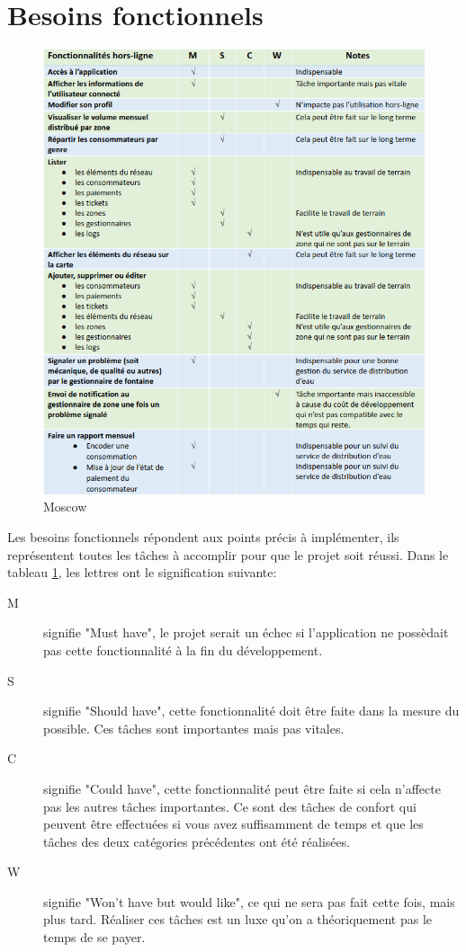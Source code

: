 \documentclass{EPL-master-thesis-covers-FR}
\begin{document}
		\section{Besoins fonctionnels}
			\label{sec:besoins_fonctionnels}	
				
			\begin{figure}[H]
				\centering
				\includegraphics[width=1\textwidth]{images/moscow}
				\caption{Moscow}
				\label{fig:moscow}
			\end{figure}
			
			Les besoins fonctionnels répondent aux points précis à implémenter, ils représentent toutes les tâches à accomplir pour que le projet soit réussi. Dans le tableau \ref{fig:moscow}, les lettres ont le signification suivante: 
			\begin{description}
				\item[M] signifie "Must have", le projet serait un échec si l'application ne possèdait pas cette fonctionnalité à la fin du développement.
				\item[S] signifie "Should have", cette fonctionnalité doit être faite dans la mesure du possible. Ces tâches sont importantes mais pas vitales.
				\item[C] signifie "Could have", cette fonctionnalité peut être faite si cela n'affecte pas les autres tâches importantes. Ce sont des tâches de confort qui peuvent être effectuées si vous avez suffisamment de temps et que les tâches des deux catégories précédentes ont été réalisées.
				\item[W] signifie "Won't have but would like", ce qui ne sera pas fait cette fois, mais plus tard. Réaliser ces tâches est un luxe qu'on a théoriquement pas le temps de se payer.
			\end{description}
			
\end{document}
